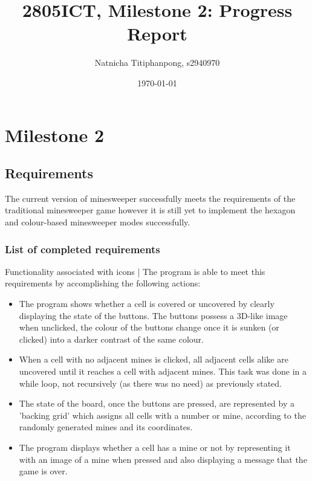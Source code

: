 \documentclass[12pt, a4]{report}
\title{2805ICT, Milestone 2: Progress Report}
\author{Natnicha Titiphanpong, s2940970}%
\date{\today}
\begin{document}
	
	\begin{titlepage}
		\maketitle
	\end{titlepage}
	\tableofcontents
	\pagebreak
	\section{Milestone 2}
	\subsection{Requirements}
	\par The current  version of minesweeper successfully meets the requirements of the traditional minesweeper game however it is still yet to implement the hexagon and colour-based minesweeper  modes successfully. 
		\subsubsection{List of completed requirements}
		Functionality associated with icons |
		The program is able to meet this requirements by accomplishing the following actions:
		\begin{itemize}
			\item The program shows whether a cell is covered or uncovered by clearly displaying the state of the buttons. The buttons possess a 3D-like image when unclicked, the colour of the buttons change once it is sunken (or clicked) into a darker contrast of the same colour. 
			\item When a cell with no adjacent mines is clicked, all adjacent cells alike are uncovered until it reaches a cell with adjacent mines. This task was done in a while loop, not recursively (as there was no need) as previously stated. 
			\item The state of the board, once the buttons are pressed, are represented by a 'backing grid' which assigns all cells with a number or mine, according to the randomly generated mines and its coordinates.
			\item The program displays whether a cell has a mine or not by representing it with an image of a mine when pressed and also displaying a message that the game is over.
		\end{itemize}
\end{document}
